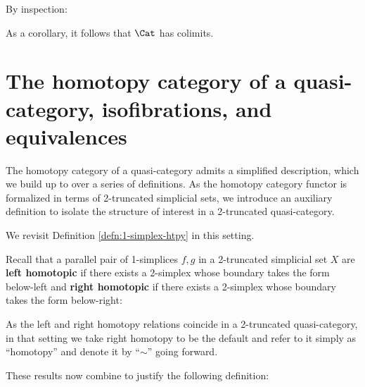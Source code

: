    By inspection:



   As a corollary, it follows that $\Cat$ has colimits.

\section{The homotopy category of a quasi-category, isofibrations, and equivalences}\label{sec:homotopy-category}

   The homotopy category of a quasi-category admits a simplified description, which we build up to over a series of definitions. As the homotopy category functor is formalized in terms of 2-truncated simplicial sets, we introduce an auxiliary definition to isolate the structure of interest in a 2-truncated quasi-category.




   We revisit Definition \ref{defn:1-simplex-htpy} in this setting.

   Recall that a parallel pair of 1-sim\-plices $f,g$ in a 2-truncated simplicial set $X$ are \textbf{left homotopic} if there exists a 2-simplex whose boundary takes the form below-left and \textbf{right homotopic} if there exists a 2-simplex whose boundary takes the form below-right:
   \begin{center}
   \end{center}



As the left and right homotopy relations coincide in a 2-truncated quasi-category, in that setting we take right homotopy to be the default and refer to it simply as ``homotopy'' and denote it by ``$\sim$'' going forward.





These results now combine to justify the following definition:

